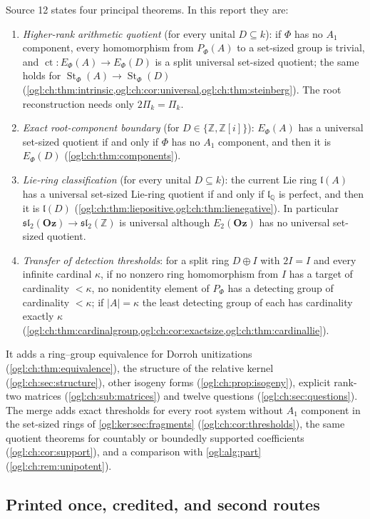 \documentclass[11pt,oneside]{article}
\numberwithin{equation}{section}
\theoremstyle{definition}
\theoremstyle{remark}
\newcommand{\Oz}{\mathbf{Oz}}
\newcommand{\Z}{\mathbb Z}
\newcommand{\Q}{\mathbb Q}
\newcommand{\ct}{\operatorname{ct}}
\newcommand{\St}{\operatorname{St}}
\begin{document}
Source 12 states four principal theorems. In this report they are:
\begin{enumerate}[label=\textup{(\Alph*)},leftmargin=*]
\item \emph{Higher-rank arithmetic quotient} (for every unital $D\subseteq k$):
if $\Phi$ has no $A_1$ component, every homomorphism from $P_\Phi(A)$ to a
set-sized group is trivial, and $\ct:E_\Phi(A)\to E_\Phi(D)$ is a split
universal set-sized quotient; the same holds for $\St_\Phi(A)\to\St_\Phi(D)$
(\cref{ogl:ch:thm:intrinsic,ogl:ch:cor:universal,ogl:ch:thm:steinberg}). The
root reconstruction needs only $2\Pi_k=\Pi_k$.
\item \emph{Exact root-component boundary} (for $D\in\{\Z,\Z[i]\}$): $E_\Phi(A)$
has a universal set-sized quotient if and only if $\Phi$ has no $A_1$
component, and then it is $E_\Phi(D)$ (\cref{ogl:ch:thm:components}).
\item \emph{Lie-ring classification} (for every unital $D\subseteq k$): the
current Lie ring $\mathfrak l(A)$ has a universal set-sized Lie-ring quotient if
and only if $\mathfrak l_\Q$ is perfect, and then it is $\mathfrak l(D)$
(\cref{ogl:ch:thm:liepositive,ogl:ch:thm:lienegative}). In particular
$\mathfrak{sl}_2(\Oz)\to\mathfrak{sl}_2(\Z)$ is universal although $E_2(\Oz)$
has no universal set-sized quotient.
\item \emph{Transfer of detection thresholds}: for a split ring $D\oplus I$
with $2I=I$ and every infinite cardinal $\kappa$, if no nonzero ring
homomorphism from $I$ has a target of cardinality $<\kappa$, no nonidentity
element of $P_\Phi$ has a detecting group of cardinality $<\kappa$; if
$|A|=\kappa$ the least detecting group of each has cardinality exactly $\kappa$
(\cref{ogl:ch:thm:cardinalgroup,ogl:ch:cor:exactsize,ogl:ch:thm:cardinallie}).
\end{enumerate}
It adds a ring--group equivalence for Dorroh unitizations
(\cref{ogl:ch:thm:equivalence}), the structure of the relative kernel
(\cref{ogl:ch:sec:structure}), other isogeny forms
(\cref{ogl:ch:prop:isogeny}), explicit rank-two matrices
(\cref{ogl:ch:sub:matrices}) and twelve questions
(\cref{ogl:ch:sec:questions}). The merge adds exact thresholds for every root
system without $A_1$ component in the set-sized rings of
\cref{ogl:ker:sec:fragments} (\cref{ogl:ch:cor:thresholds}), the same quotient
theorems for countably or boundedly supported coefficients
(\cref{ogl:ch:cor:support}), and a comparison with \cref{ogl:alg:part}
(\cref{ogl:ch:rem:unipotent}).

\subsection{Printed once, credited, and second routes}\label{ogl:ch:sub:once}
\end{document}
